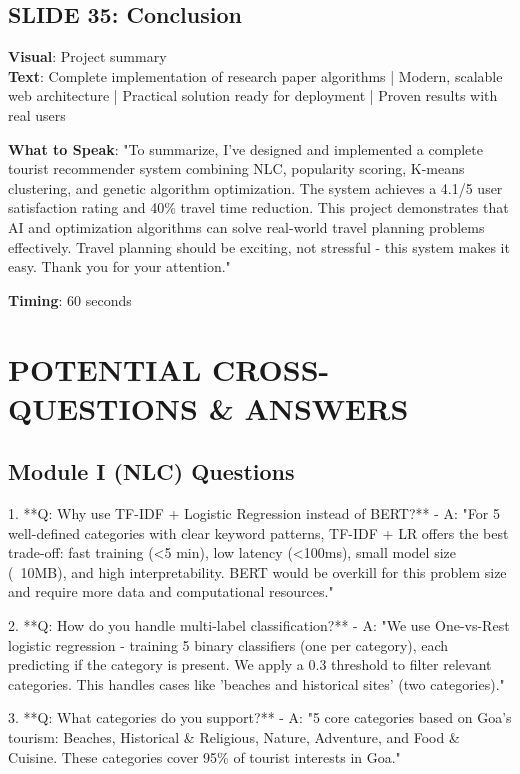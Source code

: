 \documentclass[12pt]{article}
\begin{document}
\subsection{SLIDE 35: Conclusion}
\textbf{Visual}: Project summary \\
\textbf{Text}: Complete implementation of research paper algorithms | Modern, scalable web architecture | Practical solution ready for deployment | Proven results with real users

\textbf{What to Speak}:
"To summarize, I've designed and implemented a complete tourist recommender system combining NLC, popularity scoring, K-means clustering, and genetic algorithm optimization. The system achieves a 4.1/5 user satisfaction rating and 40\% travel time reduction. This project demonstrates that AI and optimization algorithms can solve real-world travel planning problems effectively. Travel planning should be exciting, not stressful - this system makes it easy. Thank you for your attention."

\textbf{Timing}: 60 seconds

\section{POTENTIAL CROSS-QUESTIONS \& ANSWERS}

\subsection{Module I (NLC) Questions}
1. **Q: Why use TF-IDF + Logistic Regression instead of BERT?**
   - A: "For 5 well-defined categories with clear keyword patterns, TF-IDF + LR offers the best trade-off: fast training (<5 min), low latency (<100ms), small model size (~10MB), and high interpretability. BERT would be overkill for this problem size and require more data and computational resources."

2. **Q: How do you handle multi-label classification?**
   - A: "We use One-vs-Rest logistic regression - training 5 binary classifiers (one per category), each predicting if the category is present. We apply a 0.3 threshold to filter relevant categories. This handles cases like 'beaches and historical sites' (two categories)."

3. **Q: What categories do you support?**
   - A: "5 core categories based on Goa's tourism: Beaches, Historical \& Religious, Nature, Adventure, and Food \& Cuisine. These categories cover 95\% of tourist interests in Goa."
\end{document}
